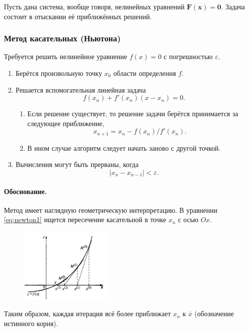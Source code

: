 Пусть дана система, вообще говоря, нелинейных уравнений $ \mathbf{F}(\mathbf{x}) =
\mathbf{0}$. Задача состоит в отыскании её приближённых решений.

\subsubsection{Метод касательных (Ньютона)}
\begin{alg} Требуется решить нелинейное уравнение $ f(x) = 0
  $ с погрешностью $ \varepsilon $.
  \begin{enumerate}
    \item Берётся произвольную точку $ x_0 $ области определения $ f $.
    \item Решается вспомогательная линейная задача
      \begin{equation}\label{eq:newton1}
        f(x_n) + f'(x_n)(x-x_n) = 0.
      \end{equation}
      \begin{enumerate}
        \item Если решение существует, то решение задачи берётся принимается за следующее приближение, 
          \[
            x_{n+1} = x_n - f(x_n)/f'(x_n).
          \]
        \item В ином случае алгоритм следует начать заново с другой точкой.
      \end{enumerate}
    \item Вычисления могут быть прерваны, когда 
      \begin{equation}\label{eq:newton-pogr}
      |x_n - x_{n-1}| < \varepsilon.
    \end{equation}
  \end{enumerate}
\end{alg}

\paragraph{Обоснование.} Метод имеет наглядную геометрическую интерпретацию. В
уравнении \eqref{eq:newton1}
ищется пересечение касательной в точке $ x_n $ с осью $ Ox $. 
\begin{figure}[h]
  \centering
  \includegraphics[width=0.4\textwidth]{img/newton.png}
  \label{fig:newton}
\end{figure}
Таким образом, каждая итерация всё более приближает $ x_n $ к $ \bar x $
(обозначение истинного корня).

